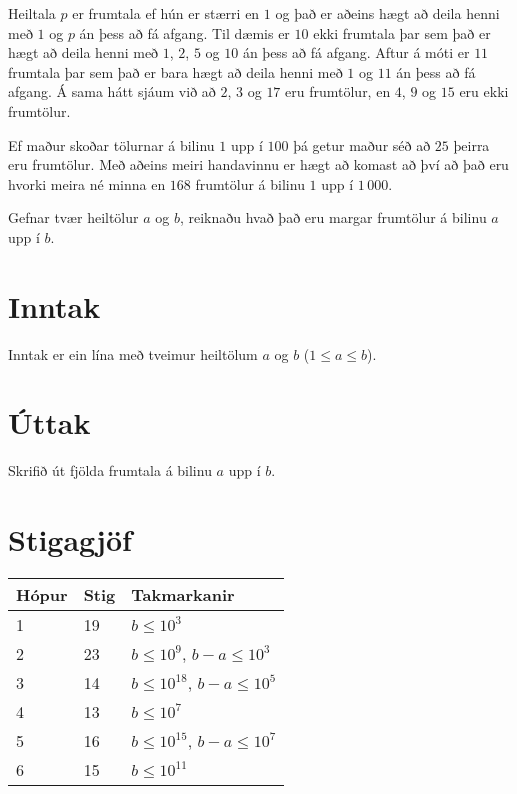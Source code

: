 %
Heiltala $p$ er frumtala ef hún er stærri en $1$ og það er aðeins hægt að deila
henni með $1$ og $p$ án þess að fá afgang. Til dæmis er $10$ ekki frumtala þar
sem það er hægt að deila henni með $1$, $2$, $5$ og $10$ án þess að fá afgang.
Aftur á móti er $11$ frumtala þar sem það er bara hægt að deila henni með $1$ og
$11$ án þess að fá afgang. Á sama hátt sjáum við að $2$, $3$ og $17$ eru
frumtölur, en $4$, $9$ og $15$ eru ekki frumtölur.

Ef maður skoðar tölurnar á bilinu $1$ upp í $100$ þá getur maður séð að $25$
þeirra eru frumtölur. Með aðeins meiri handavinnu er hægt að komast að því að
það eru hvorki meira né minna en $168$ frumtölur á bilinu $1$ upp í $1\,000$.

Gefnar tvær heiltölur $a$ og $b$, reiknaðu hvað það eru margar frumtölur á
bilinu $a$ upp í $b$.

\section*{Inntak}
Inntak er ein lína með tveimur heiltölum $a$ og $b$ ($1 \leq a \leq b$).

\section*{Úttak}
Skrifið út fjölda frumtala á bilinu $a$ upp í $b$.

\section*{Stigagjöf}
\begin{tabular}{|l|l|l|}
\hline
Hópur & Stig & Takmarkanir \\ \hline
1     & 19   & $b \leq 10^3$ \\ \hline
2     & 23   & $b \leq 10^9$, $b-a \leq 10^3$ \\ \hline
3     & 14   & $b \leq 10^{18}$, $b-a \leq 10^5$ \\ \hline
4     & 13   & $b \leq 10^7$ \\ \hline
5     & 16   & $b \leq 10^{15}$, $b-a \leq 10^7$ \\ \hline
6     & 15   & $b \leq 10^{11}$ \\ \hline
\end{tabular}

